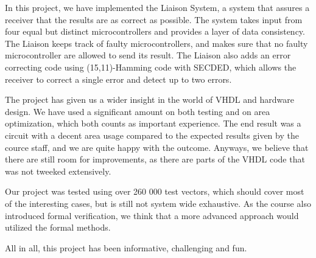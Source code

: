 In this project, we have implemented the Liaison System, a system that assures a receiver that the results are as correct as possible.
The system takes input from four equal but distinct microcontrollers and provides a layer of data consistency. The Liaison keeps track
of faulty microcontrollers, and makes sure that no faulty microcontroller are allowed to send its result. The Liaison also adds an error
correcting code using (15,11)-Hamming code with SECDED, which allows the receiver to correct a single error and detect up to two errors.

The project has given us a wider insight in the world of VHDL and hardware design. We have used a significant amount on both testing and
on area optimization, which both counts as important experience. The end result was a circuit with a decent area usage compared to the
expected results given by the cource staff, and we are quite happy with the outcome. Anyways, we believe that there are still room for
improvements, as there are parts of the VHDL code that was not tweeked extensively.

Our project was tested using over 260 000 test vectors, which should cover most of the interesting cases, but is still not system wide
exhaustive. As the course also introduced formal verification, we think that a more advanced approach would utilized the formal methods.

All in all, this project has been informative, challenging and fun.
